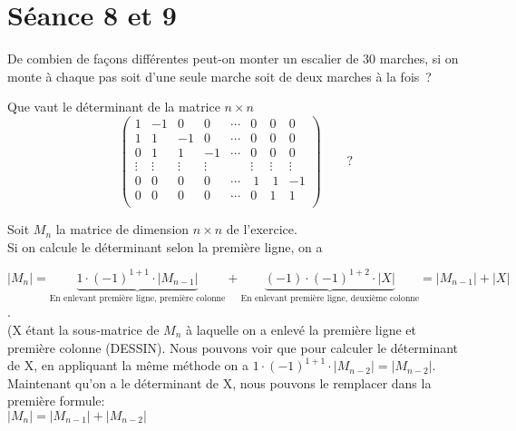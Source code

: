 \section{Séance 8 et 9}

\begin{exo}
De combien de fa\c{c}ons diff\'erentes peut-on monter un escalier de 30 marches, si on monte \`a chaque pas soit d'une seule marche soit de deux marches \`a la fois~?
\end{exo}


\begin{exo} 
Que vaut le d\'eterminant de la matrice $n \times n$ 
$$
\left( 
\begin{array}{rrrrrrrr}
1 &-1 &0  &0  &\cdots &0 &0 &0\\
1 & 1 &-1 &0  &\cdots &0 &0 &0\\
0 & 1 &1  &-1 &\cdots &0 &0 &0\\
\vdots & \vdots & \vdots & \vdots && \vdots & \vdots &\vdots\\
0 & 0 & 0 & 0 & \cdots & ~1 &~1 &-1\\
0 & 0 & 0 & 0 & \cdots & 0 &1 &1\\
\end{array}
\right) \qquad ?
$$
\end{exo}

Soit $M_n$ la matrice de dimension $n\times n$ de l'exercice.\\

Si on calcule le déterminant selon la première ligne, on a 

$$|M_n| = \underbrace{1\cdot (-1)^{1+1} \cdot |M_{n-1}|}_{\text{En enlevant première ligne, première colonne}} + \underbrace{(-1) \cdot (-1)^{1+2} \cdot |X|}_{\text{En enlevant première ligne, deuxième colonne}} = |M_{n-1}| + |X|$$. \\

(X étant la sous-matrice de $M_n$ à laquelle on a enlevé la première ligne et première colonne (DESSIN). Nous pouvons voir que pour calculer le déterminant de X, en appliquant la même méthode on a $1 \cdot (-1)^{1+1} \cdot |M_{n-2}| = |M_{n-2}|$.\\

Maintenant qu'on a le déterminant de X, nous pouvons le remplacer dans la première formule:\\

$|M_{n}| = |M_{n-1}| + |M_{n-2}|$\\

